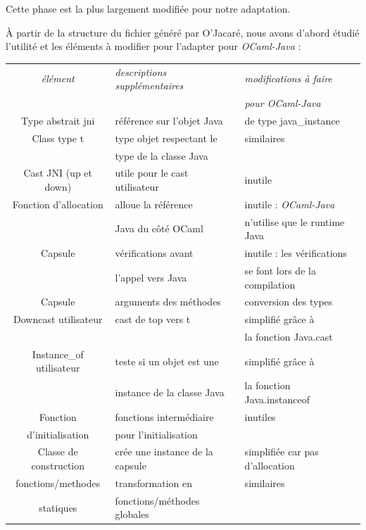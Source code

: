 \documentclass[a4paper, 11pt]{article}
\begin{document}
Cette phase est la plus largement modifiée pour notre adaptation.

\`A partir de la structure du fichier généré par O'Jacaré, nous avons d'abord étudié l'utilité et les éléments à modifier pour l'adapter pour \emph{OCaml-Java} :



\begin{tabular}{|c|l|l|}
  \hline
  \emph{élément} & \emph{descriptions supplémentaires} & \emph{modifications à faire}\\
  & & \emph{pour OCaml-Java} \\
  \hline
  Type abstrait jni & référence sur l'objet Java & de type java\_instance\\
  \hline
  Class type t & type objet respectant le & similaires\\
  & type de la classe Java & \\
  \hline
  Cast JNI (up et down) & utile pour le cast utilisateur & inutile\\
  \hline
  Fonction d'allocation & alloue la référence & inutile : \emph{OCaml-Java} \\
  & Java du côté OCaml & n'utilise que le runtime Java\\
  \hline
  Capsule & vérifications avant & inutile : les vérifications \\
&l'appel vers Java & se font lors de la compilation \\
  \hline
  Capsule & arguments des méthodes & conversion des types \\
  \hline
  Downcast utilisateur & cast de top vers t & simplifié grâce à \\
  & & la fonction Java.cast\\
  \hline
  Instance\_of utilisateur & teste si un objet est une & simplifié grâce à \\
  & instance de la classe Java & la fonction Java.instanceof \\
  \hline
  Fonction  & fonctions intermédiaire  & inutiles \\
   d'initialisation &pour l'initialisation & \\
\hline
  Classe de construction & crée une instance de la capsule & simplifiée car pas d'allocation\\
  \hline
  fonctions/methodes& transformation en  & similaires \\
statiques & fonctions/méthodes globales & \\
  \hline
\end{tabular}
\end{document}
